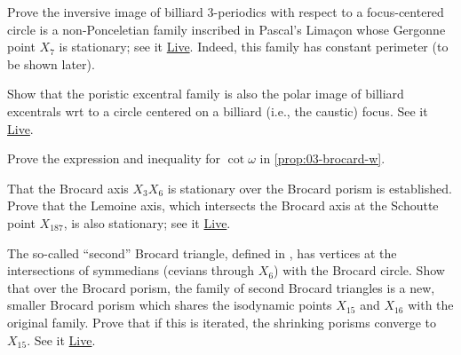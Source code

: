 \begin{exercise}
Prove the inversive image of billiard 3-periodics with respect to a focus-centered circle is a non-Ponceletian family inscribed in Pascal's Limaçon whose Gergonne point $X_7$ is stationary; see it \href{https://bit.ly/3edwKD7}{Live}. Indeed, this family has constant perimeter (to be shown later).
\end{exercise}

\begin{exercise}
Show that the poristic excentral family is also the polar image of billiard excentrals wrt to a circle centered on a billiard (i.e., the caustic) focus. See it \href{https://bit.ly/33c1s9A}{Live}.
\end{exercise}

\begin{exercise}
Prove the expression and inequality for $\cot{\omega}$ in \cref{prop:03-brocard-w}.
\end{exercise}

\begin{exercise}
That the Brocard axis $X_3 X_6$ is stationary over the Brocard porism is established. Prove that the Lemoine axis, which intersects the Brocard axis at the Schoutte point $X_{187}$, is also stationary; see it \href{https://bit.ly/3nTRi75}{Live}.
\end{exercise}

\begin{exercise}
The so-called ``second'' Brocard triangle, defined in \cite[Second Brocard Triangle]{mw}, has vertices at the intersections of symmedians (cevians through $X_6$) with the Brocard circle. Show that over the Brocard porism, the family of second Brocard triangles is a new, smaller Brocard porism which shares the isodynamic points $X_{15}$ and $X_{16}$ with the original family. Prove that if this is iterated, the shrinking porisms converge to $X_{15}$. See it \href{https://bit.ly/3ttMNBg}{Live}.
\end{exercise}